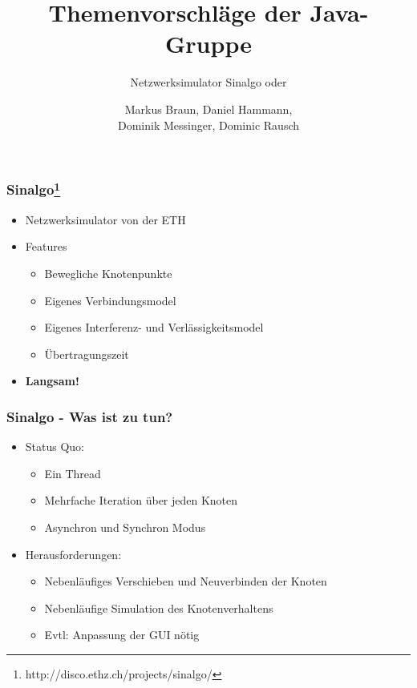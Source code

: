 \documentclass[24pt]{beamer}
\title{Themenvorschläge der Java-Gruppe}
\subtitle{Netzwerksimulator Sinalgo oder}
\author{Markus Braun, Daniel Hammann,\\ 
	Dominik Messinger, Dominic Rausch}
\begin{document}
	\maketitle

	\begin{frame}[c]\frametitle{Sinalgo\footnote{http://disco.ethz.ch/projects/sinalgo/} }
		\begin{itemize}
			\item Netzwerksimulator von der ETH
			\item Features
			\begin{itemize}
				\item Bewegliche Knotenpunkte
				\item Eigenes Verbindungsmodel
				\item Eigenes Interferenz- und Verlässigkeitsmodel
				\item Übertragungszeit
			\end{itemize}
			\item \textbf{Langsam!}
		\end{itemize}
	\end{frame}

	\begin{frame}[c]\frametitle{Sinalgo - Was ist zu tun?}
		\begin{itemize}
			\item Status Quo:
		    \begin{itemize}
		    	\item Ein Thread
		    	\item Mehrfache Iteration über jeden Knoten
		    	\item Asynchron und Synchron Modus
		    \end{itemize}
		    \item Herausforderungen:
		    \begin{itemize}
		    	\item Nebenläufiges Verschieben und Neuverbinden der Knoten
		    	\item Nebenläufige Simulation des Knotenverhaltens
		    	\item Evtl: Anpassung der GUI nötig
		    \end{itemize}
		\end{itemize}
	\end{frame}
\end{document}

